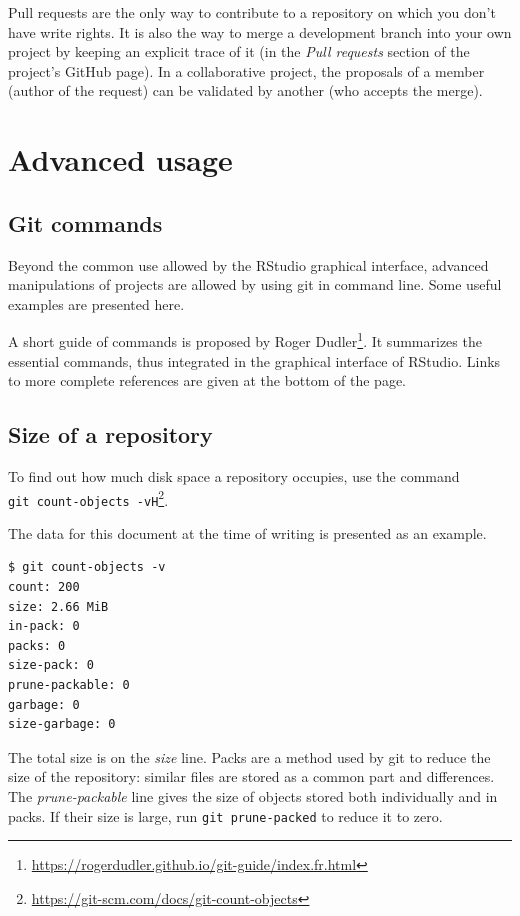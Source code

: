 \documentclass[
  12pt,
  american,
  a4paper,
  extrafontsizes,onecolumn,openright
  ]{memoir}
\newlength{\rf}
\begin{document}
Pull requests are the only way to contribute to a repository on which you don't have write rights.
It is also the way to merge a development branch into your own project by keeping an explicit trace of it (in the \emph{Pull requests} section of the project's GitHub page).
In a collaborative project, the proposals of a member (author of the request) can be validated by another (who accepts the merge).

\section{Advanced usage}\label{advanced-usage}

\subsection{Git commands}\label{git-commands}

Beyond the common use allowed by the RStudio graphical interface, advanced manipulations of projects are allowed by using git in command line.
Some useful examples are presented here.

A short guide of commands is proposed by Roger Dudler\footnote{\url{https://rogerdudler.github.io/git-guide/index.fr.html}}.
It summarizes the essential commands, thus integrated in the graphical interface of RStudio.
Links to more complete references are given at the bottom of the page.

\subsection{Size of a repository}\label{size-of-a-repository}

To find out how much disk space a repository occupies, use the command \texttt{git\ count-objects\ -vH}\footnote{\url{https://git-scm.com/docs/git-count-objects}}.

The data for this document at the time of writing is presented as an example.

\begin{verbatim}
$ git count-objects -v
count: 200
size: 2.66 MiB
in-pack: 0
packs: 0
size-pack: 0
prune-packable: 0
garbage: 0
size-garbage: 0
\end{verbatim}

The total size is on the \emph{size} line.
Packs are a method used by git to reduce the size of the repository: similar files are stored as a common part and differences.
The \emph{prune-packable} line gives the size of objects stored both individually and in packs.
If their size is large, run \texttt{git\ prune-packed} to reduce it to zero.
\end{document}
